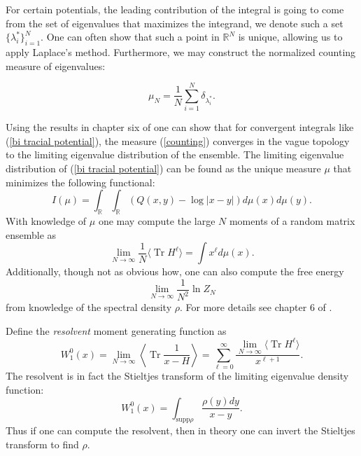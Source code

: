 \documentclass[10pt]{article}
\DeclareMathOperator{\tr}{Tr}
\begin{document}
\begin{appendices}
	For certain potentials, the leading contribution of the integral is going to come from the set of eigenvalues that maximizes the integrand, we denote such a set $\{\lambda_{i}^{*}\}_{i=1}^{N}$. One can often show that such a point in $\mathbb{R}^{N}$ is unique, allowing us to apply Laplace's method. Furthermore, we may construct the normalized counting measure of eigenvalues:
	
	\begin{equation}\label{counting}
		\mu_{N} = \frac{1}{N}\sum_{i=1}^{N}\delta_{\lambda_{i}^{*}}.
	\end{equation}


	Using the results in chapter six of \cite{Deift} one can show that for  convergent integrals like (\ref{bi tracial potential}), the measure (\ref{counting}) converges in the vague topology to the limiting eigenvalue distribution of the ensemble. The limiting eigenvalue distribution of  (\ref{bi tracial potential}) can be found as the unique measure $\mu$ that minimizes the following functional:
	\begin{equation*}
		I(\mu) = \int_\mathbb{R}\int_\mathbb{R}\left(Q(x,y)-\log |x-y|  \right) d\mu(x) d\mu(y).
	\end{equation*} 
	With knowledge of $\mu$ one may compute the large $N$ moments of a random matrix ensemble as 
	\begin{equation*}
		\lim_{N \rightarrow \infty} \frac{1}{N}\langle \tr H^{\ell} \rangle =\int x^{\ell}d\mu(x). 
	\end{equation*} 
Additionally, though not as obvious how, one can also compute the free energy
\begin{equation*}
	\lim_{N \rightarrow \infty}\frac{1}{N^{2}}\ln Z_{N}
\end{equation*}
from knowledge of the spectral density $\rho$. For more details see chapter 6 of \cite{Deift}.
	
	Define the \textit{resolvent} moment generating function as 
	\begin{equation*}
		W_{1}
		^{0}(x) = \lim_{N \rightarrow \infty}\left \langle \tr\frac{1}{x-H}\right\rangle = \sum_{\ell=0}^{\infty}\frac{\lim_{N \rightarrow \infty} \langle \tr H^{\ell}\rangle }{x^{\ell+1}}.  
	\end{equation*}
	The resolvent is in fact the Stieltjes transform of the limiting eigenvalue density function:
	\begin{equation*}
		W^{0}_{1}(x) = \int_{\text{supp} \rho }\frac{\rho(y)dy}{x-y}.
	\end{equation*}
	Thus if one can compute the resolvent, then in theory one can invert the Stieltjes transform to find $\rho$.
	

\end{appendices}
\end{document}
